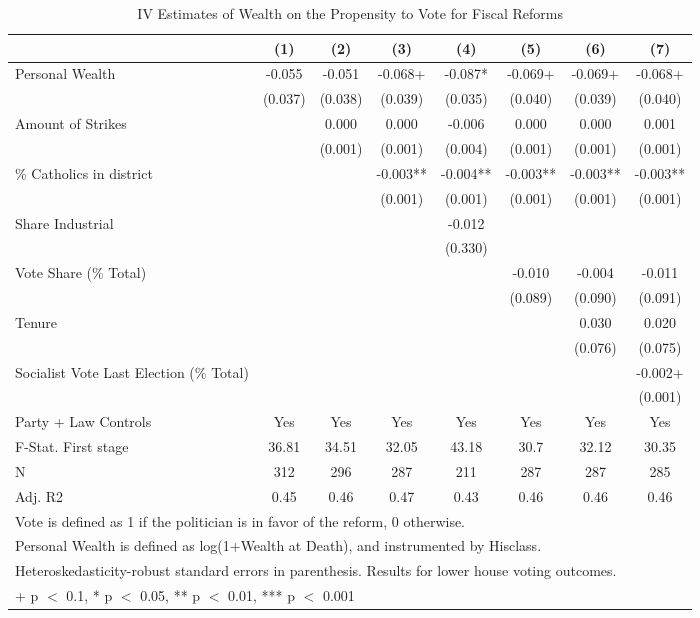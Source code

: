 \begin{table}

\caption{\label{tab:ivresults}IV Estimates of Wealth on the Propensity to Vote for Fiscal Reforms}
\centering
\begin{tabular}[t]{lccccccc}
\toprule
  & (1) & (2) & (3) & (4) & (5) & (6) & (7)\\
\midrule
Personal Wealth & -0.055 & -0.051 & -0.068+ & -0.087* & -0.069+ & -0.069+ & -0.068+\\
 & (0.037) & (0.038) & (0.039) & (0.035) & (0.040) & (0.039) & (0.040)\\
Amount of Strikes &  & 0.000 & 0.000 & -0.006 & 0.000 & 0.000 & 0.001\\
 &  & (0.001) & (0.001) & (0.004) & (0.001) & (0.001) & (0.001)\\
\% Catholics in district &  &  & -0.003** & -0.004** & -0.003** & -0.003** & -0.003**\\
 &  &  & (0.001) & (0.001) & (0.001) & (0.001) & (0.001)\\
Share Industrial &  &  &  & -0.012 &  &  & \\
 &  &  &  & (0.330) &  &  & \\
Vote Share (\% Total) &  &  &  &  & -0.010 & -0.004 & -0.011\\
 &  &  &  &  & (0.089) & (0.090) & (0.091)\\
Tenure &  &  &  &  &  & 0.030 & 0.020\\
 &  &  &  &  &  & (0.076) & (0.075)\\
Socialist Vote Last Election (\% Total) &  &  &  &  &  &  & -0.002+\\
 &  &  &  &  &  &  & (0.001)\\
\midrule
Party + Law Controls & Yes & Yes & Yes & Yes & Yes & Yes & Yes\\
F-Stat. First stage & 36.81 & 34.51 & 32.05 & 43.18 & 30.7 & 32.12 & 30.35\\
N & 312 & 296 & 287 & 211 & 287 & 287 & 285\\
Adj. R2 & 0.45 & 0.46 & 0.47 & 0.43 & 0.46 & 0.46 & 0.46\\
\bottomrule
\multicolumn{8}{l}{\rule{0pt}{1em}Vote is defined as 1 if the politician is in favor of the reform, 0 otherwise.}\\
\multicolumn{8}{l}{\rule{0pt}{1em}Personal Wealth is defined as log(1+Wealth at Death), and instrumented by Hisclass.}\\
\multicolumn{8}{l}{\rule{0pt}{1em}Heteroskedasticity-robust standard errors in parenthesis. Results for lower house voting outcomes.}\\
\multicolumn{8}{l}{\rule{0pt}{1em}+ p $<$ 0.1, * p $<$ 0.05, ** p $<$ 0.01, *** p $<$ 0.001}\\
\end{tabular}
\end{table}
